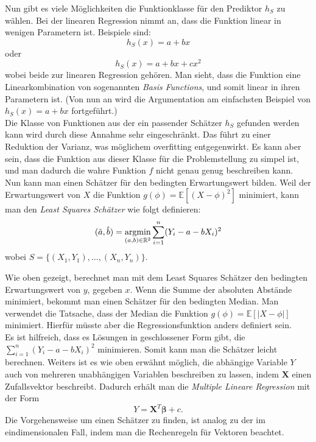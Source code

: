 Nun gibt es viele M\"oglichkeiten die Funktionklasse f\"ur den Prediktor $h_S$ zu w\"ahlen. Bei der linearen
Regression nimmt an, dass die Funktion linear in wenigen Parametern ist. Beispiele sind:
$$ h_S(x) = a + bx $$
oder
$$ h_S(x) = a + bx + cx^2$$
wobei beide zur linearen Regression geh\"oren. Man sieht, dass die Funktion eine Linearkombination von sogenannten \textit{Basis Functions}, und somit
linear in ihren Parametern ist. (Von nun an wird die Argumentation am einfachsten Beispiel von $ h_S(x) = a + bx $ fortgef\"uhrt.)\\

Die Klasse von Funktionen aus der ein passender Sch\"atzer $h_S$ gefunden werden kann wird durch diese Annahme sehr eingeschr\"ankt. Das f\"uhrt zu einer
Reduktion der Varianz, was m\"oglichem overfitting entgegenwirkt. Es kann aber sein, dass die Funktion aus dieser Klasse f\"ur die Problemstellung zu simpel ist, und
man dadurch die wahre Funktion $f$ nicht genau genug beschreiben kann. \\

Nun kann man einen Sch\"atzer f\"ur den bedingten Erwartungswert bilden.
Weil der Erwartungswert von $X$ die Funktion $g(\phi) = \mathbb{E}[(X - \phi)^2]$ minimiert, kann man den \textit{Least Squares Sch\"atzer} wie folgt definieren:
$$ (\hat{a}, \hat{b}) = \operatorname*{argmin}_{(a,b) \in \mathbb{R}^2} \sum_{i=1}^n (Y_i - a - bX_i)^2$$
wobei $S = \{(X_1, Y_1), \dots , (X_n,Y_n)\}$.

Wie oben gezeigt, berechnet man mit dem Least Squares Sch\"atzer den bedingten Erwartungswert von $y$, gegeben $x$.
Wenn die Summe der absoluten Abst\"ande minimiert, bekommt man einen Sch\"atzer f\"ur den bedingten Median. Man verwendet die Tatsache, dass
der Median die Funktion $g(\phi) = \mathbb{E}[|X - \phi|]$ minimiert. Hierfür müsste aber die Regressionsfunktion anders definiert sein. \\

Es ist hilfreich, dass es L\"osungen in geschlossener Form gibt, die $\sum_{i=1}^n (Y_i - a - bX_i)^2 $ minimieren. Somit kann man die Sch\"atzer leicht berechnen.
Weiters ist es wie oben erw\"ahnt m\"oglich, die abh\"angige Variable $Y$ auch von mehreren unabh\"angigen Variablen beschreiben zu lassen, indem $\mathbf{X}$ einen Zufallsvektor beschreibt.
Dadurch erh\"alt man die \textit{Multiple Lineare Regression}
mit der Form
$$ Y = \mathbf{X}^T\mathbf{\beta} + c. $$
Die Vorgehensweise um einen Sch\"atzer zu finden, ist analog zu der im eindimensionalen Fall, indem man die Rechenregeln f\"ur Vektoren beachtet. \\

